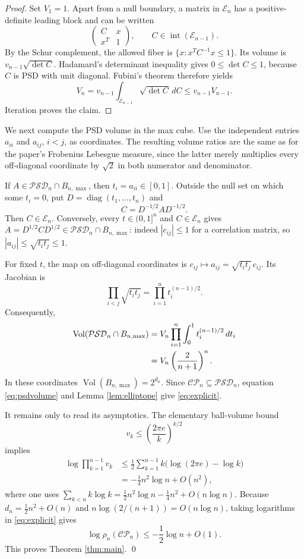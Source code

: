\documentclass[11pt]{article}
\newcommand{\CP}{\mathcal{CP}}
\newcommand{\PSD}{\mathcal{PSD}}
\newcommand{\E}{\mathcal E}
\newcommand{\Vol}{\operatorname{Vol}}
\newcommand{\diag}{\operatorname{diag}}
\begin{document}
\begin{proof}
Set $V_1=1$.  Apart from a null boundary, a matrix in $\E_n$ has a
positive-definite leading block and can be written
\[
                 \begin{pmatrix}C&x\\x^T&1\end{pmatrix},
                 \qquad C\in\operatorname{int}(\E_{n-1}).
\]
By the Schur complement, the allowed fiber is
$\{x:x^TC^{-1}x\leq1\}$.  Its volume is
$v_{n-1}\sqrt{\det C}$.  Hadamard's determinant inequality gives
$0\leq\det C\leq1$, because $C$ is PSD with unit diagonal.  Fubini's theorem
therefore yields
\[
 V_n=v_{n-1}\int_{\E_{n-1}}\sqrt{\det C}\,dC
     \leq v_{n-1}V_{n-1}.
\]
Iteration proves the claim.
\end{proof}

We next compute the PSD volume in the max cube.  Use the independent entries
$a_{ii}$ and $a_{ij}$, $i<j$, as coordinates.  The resulting volume ratios
are the same as for the paper's Frobenius Lebesgue measure, since the latter
merely multiplies every off-diagonal coordinate by $\sqrt2$ in both numerator
and denominator.

If $A\in\PSD_n\cap B_{n,\max}$, then $t_i=a_{ii}\in[0,1]$.
Outside the null set on which some $t_i=0$, put $D=\diag(t_1,\ldots,t_n)$
and
\[
                         C=D^{-1/2}AD^{-1/2}.
\]
Then $C\in\E_n$.  Conversely, every $t\in(0,1]^n$ and $C\in\E_n$ gives
$A=D^{1/2}CD^{1/2}\in\PSD_n\cap B_{n,\max}$: indeed
$|c_{ij}|\leq1$ for a correlation matrix, so
$|a_{ij}|\leq\sqrt{t_it_j}\leq1$.

For fixed $t$, the map on off-diagonal coordinates is
$c_{ij}\mapsto a_{ij}=\sqrt{t_it_j}\,c_{ij}$.  Its Jacobian is
\[
 \prod_{i<j}\sqrt{t_it_j}
       =\prod_{i=1}^n t_i^{(n-1)/2}.
\]
Consequently,
\begin{align}
 \Vol(\PSD_n\cap B_{n,\max})
 &=V_n\prod_{i=1}^n\int_0^1t_i^{(n-1)/2}\,dt_i\notag\\
 &=V_n\left(\frac{2}{n+1}\right)^n.\label{eq:psdvolume}
\end{align}
In these coordinates $\Vol(B_{n,\max})=2^{d_n}$.  Since
$\CP_n\subseteq\PSD_n$, equation \eqref{eq:psdvolume} and Lemma
\ref{lem:elliptope} give \eqref{eq:explicit}.

It remains only to read its asymptotics.  The elementary ball-volume bound
\[
                         v_k\leq\left(\frac{2\pi e}{k}\right)^{k/2}
\]
implies
\begin{align*}
 \log\prod_{k=1}^{n-1}v_k
 &\leq\frac12\sum_{k=1}^{n-1}k\bigl(\log(2\pi e)-\log k\bigr)\\
 &=-\frac14n^2\log n+O(n^2),
\end{align*}
where one uses
$\sum_{k<n}k\log k=\frac12n^2\log n-\frac14n^2+O(n\log n)$.
Because $d_n=\frac12n^2+O(n)$ and
$n\log(2/(n+1))=O(n\log n)$, taking logarithms in
\eqref{eq:explicit} gives
\[
                \log\rho_n(\CP_n)\leq-\frac12\log n+O(1).
\]
This proves Theorem \ref{thm:main}. \qed
\end{document}

